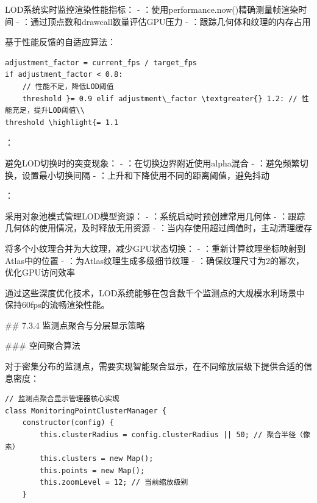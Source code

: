 {
LOD系统实时监控渲染性能指标：
- ：使用performance.now()精确测量帧渲染时间
- ：通过顶点数和drawcall数量评估GPU压力
- ：跟踪几何体和纹理的内存占用

基于性能反馈的自适应算法：
\begin{lstlisting}
adjustment_factor = current_fps / target_fps
if adjustment_factor < 0.8:
    // 性能不足，降低LOD阈值
    threshold }= 0.9 elif adjustment\_factor \textgreater{} 1.2: // 性能充足，提升LOD阈值\\
threshold \highlight{= 1.1
\end{lstlisting}

：

避免LOD切换时的突变现象：
- ：在切换边界附近使用alpha混合
- ：避免频繁切换，设置最小切换间隔
- ：上升和下降使用不同的距离阈值，避免抖动

：

采用对象池模式管理LOD模型资源：
- ：系统启动时预创建常用几何体
- ：跟踪几何体的使用情况，及时释放无用资源
- ：当内存使用超过阈值时，主动清理缓存

将多个小纹理合并为大纹理，减少GPU状态切换：
- ：重新计算纹理坐标映射到Atlas中的位置
- ：为Atlas纹理生成多级细节纹理
- ：确保纹理尺寸为2的幂次，优化GPU访问效率

通过这些深度优化技术，LOD系统能够在包含数千个监测点的大规模水利场景中保持60fps的流畅渲染性能。

## 7.3.4 监测点聚合与分层显示策略

### 空间聚合算法


对于密集分布的监测点，需要实现智能聚合显示，在不同缩放层级下提供合适的信息密度：

\begin{lstlisting}[style=javascript]
// 监测点聚合显示管理器核心实现
class MonitoringPointClusterManager {
    constructor(config) {
        this.clusterRadius = config.clusterRadius || 50; // 聚合半径（像素）
        this.clusters = new Map();
        this.points = new Map();
        this.zoomLevel = 12; // 当前缩放级别
    }
    

\end{lstlisting}}
